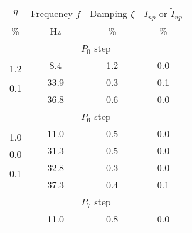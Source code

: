 \documentclass[11pt]{article}
\begin{document}
\begin{table}
\centering
\begin{tabular}{|c|c|c|c|}
\hline
\multirow{2}{*}{$\eta $} & \multirow{2}{*}{Frequency $f$} & 
\multirow{2}{*}{Damping $\zeta $} & 
\multirow{2}{*}{$I_{np}$ or $\tilde I_{np}$} \\
 & & & \\
\multirow{2}{*}{\%} & \multirow{2}{*}{Hz} & \multirow{2}{*}{\%} & \multirow{2}{*}{\%} \\
 & & & \\ \hline \hline
\multicolumn{4}{|c|}{\multirow{2}{*}{$P_0$ step}} \\
\multicolumn{4}{|c|}{} \\ \hline
 & \multirow{2}{*}{8.4} & \multirow{2}{*}{1.2} & \multirow{2}{*}{0.0} \\ \cline{1-1}
\multirow{2}{*}{1.2} & & & \\ \cline{2-4} 
 & \multirow{2}{*}{33.9} & \multirow{2}{*}{0.3} & \multirow{2}{*}{0.1} \\ \cline{1-1}
\multirow{2}{*}{0.1} & & & \\ \cline{2-4} 
 & \multirow{2}{*}{36.8} & \multirow{2}{*}{0.6} & \multirow{2}{*}{0.0} \\ \cline{1-1}
 & & & \\ \hline \hline
\multicolumn{4}{|c|}{\multirow{2}{*}{$P_6$ step}} \\
\multicolumn{4}{|c|}{} \\ \hline
 & \multirow{2}{*}{11.0} & \multirow{2}{*}{0.5} & \multirow{2}{*}{0.0} \\ \cline{1-1}
\multirow{2}{*}{1.0} & & & \\ \cline{2-4} 
 & \multirow{2}{*}{31.3} & \multirow{2}{*}{0.5} & \multirow{2}{*}{0.0} \\ \cline{1-1}
\multirow{2}{*}{0.0} & & & \\ \cline{2-4} 
 & \multirow{2}{*}{32.8} & \multirow{2}{*}{0.3} & \multirow{2}{*}{0.0} \\ \cline{1-1}
\multirow{2}{*}{0.1} & & & \\ \cline{2-4} 
 & \multirow{2}{*}{37.3} & \multirow{2}{*}{0.4} & \multirow{2}{*}{0.1} \\ \cline{1-1}
 & & & \\ \hline \hline
\multicolumn{4}{|c|}{\multirow{2}{*}{$P_7$ step}} \\
\multicolumn{4}{|c|}{} \\ \hline
 & \multirow{2}{*}{11.0} & \multirow{2}{*}{0.8} & \multirow{2}{*}{0.0} \\ \cline{1-1}

\end{tabular}
\end{table}
\end{document}

